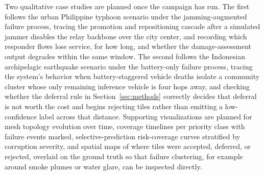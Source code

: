 \documentclass[drones,article,submit,moreauthors]{Definitions/mdpi}
\begin{document}
Two qualitative case studies are planned once the campaign has run. The first follows the urban Philippine typhoon scenario under the jamming-augmented failure process, tracing the promotion and repositioning cascade after a simulated jammer disables the relay backbone over the city center, and recording which responder flows lose service, for how long, and whether the damage-assessment output degrades within the same window. The second follows the Indonesian archipelagic earthquake scenario under the battery-only failure process, tracing the system's behavior when battery-staggered vehicle deaths isolate a community cluster whose only remaining inference vehicle is four hops away, and checking whether the deferral rule in Section~\ref{sec:methods} correctly decides that deferral is not worth the cost and begins rejecting tiles rather than emitting a low-confidence label across that distance. Supporting visualizations are planned for mesh topology evolution over time, coverage timelines per priority class with failure events marked, selective-prediction risk-coverage curves stratified by corruption severity, and spatial maps of where tiles were accepted, deferred, or rejected, overlaid on the ground truth so that failure clustering, for example around smoke plumes or water glare, can be inspected directly.
\end{document}

